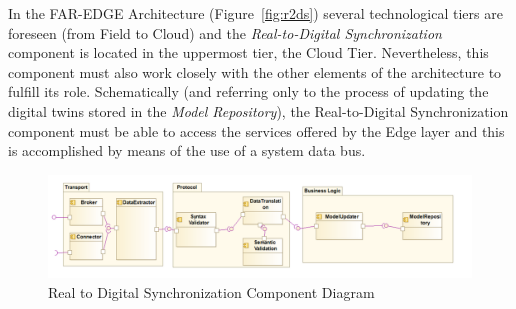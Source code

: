 


In the FAR-EDGE Architecture (Figure~\ref{fig:r2ds}) several technological tiers are foreseen (from Field to Cloud) and the \textit{Real-to-Digital Synchronization} component is located in the uppermost tier, the Cloud Tier. Nevertheless, this component must also work closely with the other elements of the architecture to fulfill its role. Schematically (and referring only to the process of updating the digital twins stored in the \textit{Model Repository}), the Real-to-Digital Synchronization component must be able to access the services offered by the Edge layer and this is accomplished by means of the use of a system data bus. 

\begin{figure}[t]
  \includegraphics[width=\linewidth]{images/diagramComponent.PNG}
  \caption{Real to Digital Synchronization Component Diagram}
  \label{fig:realToDigitalComponentDia}
\end{figure}

